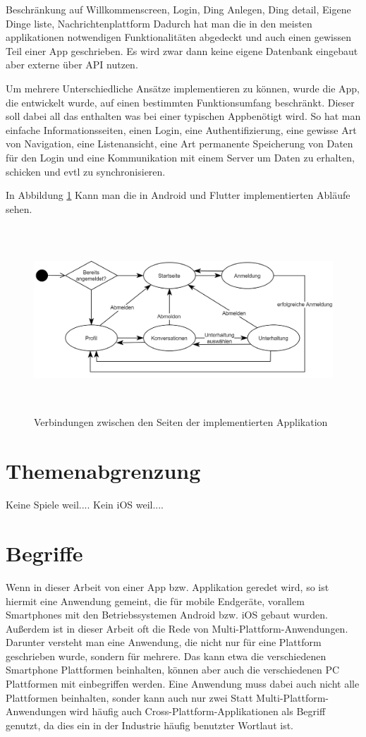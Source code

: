 Beschränkung auf Willkommenscreen, Login, Ding Anlegen, Ding detail, Eigene Dinge liste, Nachrichtenplattform
Dadurch hat man die in den meisten applikationen notwendigen Funktionalitäten abgedeckt und auch einen gewissen Teil einer App geschrieben. Es wird zwar dann keine eigene Datenbank eingebaut aber externe über API nutzen.


Um mehrere Unterschiedliche Ansätze implementieren zu können, wurde die App, die entwickelt wurde, auf einen bestimmten Funktionsumfang beschränkt. Dieser soll dabei all das enthalten was bei einer typischen Appbenötigt wird. So hat man einfache Informationsseiten, einen Login, eine Authentifizierung, eine gewisse Art von Navigation, eine Listenansicht, eine Art permanente Speicherung von Daten für den Login und eine Kommunikation mit einem Server um Daten zu erhalten, schicken und evtl zu synchronisieren.

In Abbildung \ref{fig:pageflow} Kann man die in Android und Flutter implementierten Abläufe sehen.  

\begin{figure}[ht]
  \centering
  \includegraphics[height=7cm,keepaspectratio]{images/Pageflow_native_flutter.png} 
  \caption{Verbindungen zwischen den Seiten der implementierten Applikation }
  \label{fig:pageflow}
\end{figure}

\section{Themenabgrenzung}
Keine Spiele weil....
Kein iOS weil....


\section{Begriffe}
Wenn in dieser Arbeit von einer App bzw. Applikation geredet wird, so ist hiermit eine Anwendung gemeint, die für mobile Endgeräte, vorallem Smartphones mit den Betriebssystemen Android bzw. iOS gebaut wurden.
Außerdem ist in dieser Arbeit oft die Rede von Multi-Plattform-Anwendungen. Darunter versteht man eine Anwendung, die nicht nur für eine Plattform geschrieben wurde, sondern für mehrere. Das kann etwa die verschiedenen Smartphone Plattformen beinhalten, können aber auch die verschiedenen PC Plattformen mit einbegriffen werden. Eine Anwendung muss dabei auch nicht alle Plattformen beinhalten, sonder kann auch nur zwei Statt Multi-Plattform-Anwendungen wird häufig auch Cross-Plattform-Applikationen als Begriff genutzt, da dies ein in der Industrie häufig benutzter Wortlaut ist. 

